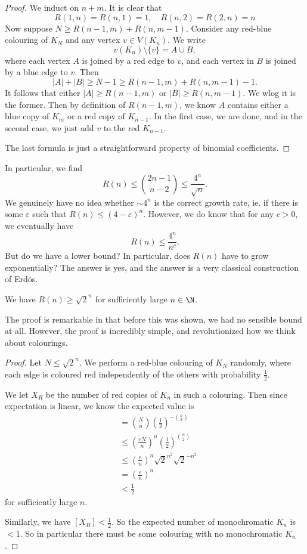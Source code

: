 \documentclass[a4paper]{article}
\begin{document}
\begin{proof}
  We induct on $n + m$. It is clear that
  \[
    R(1, n) = R(n, 1) = 1,\quad R(n, 2) = R(2, n) = n
  \]
  Now suppose $N \geq R(n - 1, m) + R(n, m - 1)$. Consider any red-blue colouring of $K_N$ and any vertex $v \in V(K_n)$. We write
  \[
    v(K_n) \setminus \{v\} = A \cup B,
  \]
  where each vertex $A$ is joined by a red edge to $v$, and each vertex in $B$ is joined by a blue edge to $v$. Then
  \[
    |A| + |B| \geq N - 1 \geq R(n - 1, m) + R(n, m - 1) - 1.
  \]
  It follows that either $|A| \geq R(n - 1, m)$ or $|B| \geq R(n, m - 1)$. We wlog it is the former. Then by definition of $R(n - 1, m)$, we know $A$ contains either a blue copy of $K_m$ or a red copy of $K_{n - 1}$. In the first case, we are done, and in the second case, we just add $v$ to the red $K_{n - 1}$.

  The last formula is just a straightforward property of binomial coefficients.
\end{proof}

In particular, we find
\[
  R(n) \leq \binom{2n - 1}{n - 2} \leq \frac{4^n}{\sqrt{n}}.
\]
We genuinely have no idea whether $\sim 4^n$ is the correct growth rate, ie. if there is some $\varepsilon$ such that $R(n) \leq (4 - \varepsilon)^n$. However, we do know that for any $c > 0$, we eventually have
\[
  R(n) \leq \frac{4^n}{n^c}.
\]
But do we have a lower bound? In particular, does $R(n)$ have to grow exponentially? The answer is yes, and the answer is a very classical construction of Erd\"os.

\begin{thm}
  We have $R(n) \geq \sqrt{2}^n$ for sufficiently large $n \in \N$.
\end{thm}
The proof is remarkable in that before this was shown, we had no sensible bound at all. However, the proof is incredibly simple, and revolutionized how we think about colourings.

\begin{proof}
  Let $N \leq \sqrt{2}^n$. We perform a red-blue colouring of $K_N$ randomly, where each edge is coloured red independently of the others with probability $\frac{1}{2}$.

  We let $X_R$ be the number of red copies of $K_n$ in such a colouring. Then since expectation is linear, we know the expected value is
  \begin{align*}
    [X_R] &= \binom{N}{n} \left(\frac{1}{2}\right)^{-\binom{n}{2}}\\
    &\leq \left(\frac{eN}{n}\right)^n \left(\frac{1}{2}\right)^{\binom{n}{2}}\\
    &\leq \left(\frac{e}{n}\right)^n \sqrt{2}^{n^2} \sqrt{2}^{-n^2}\\
    &= \left(\frac{e}{n}\right)^{n}\\
    &< \frac{1}{2}
  \end{align*}
  for sufficiently large $n$.

  Similarly, we have $[X_B] < \frac{1}{2}$. So the expected number of monochromatic $K_n$ is $< 1$. So in particular there must be some colouring with no monochromatic $K_n$.
\end{proof}
\end{document}
